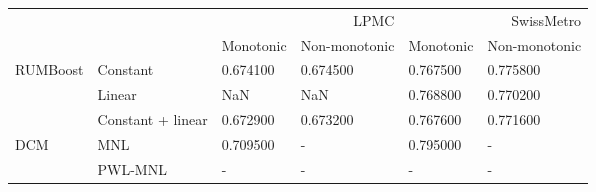 \begin{tabular}{llllll}
\toprule
 &  & \multicolumn{2}{r}{LPMC} & \multicolumn{2}{r}{SwissMetro} \\
 &  & Monotonic & Non-monotonic & Monotonic & Non-monotonic \\
\midrule
\multirow[t]{3}{*}{RUMBoost} & Constant & 0.674100 & 0.674500 & 0.767500 & 0.775800 \\
 & Linear & NaN & NaN & 0.768800 & 0.770200 \\
 & Constant + linear & 0.672900 & 0.673200 & 0.767600 & 0.771600 \\
\cline{1-6}
\multirow[t]{2}{*}{DCM} & MNL & 0.709500 & - & 0.795000 & - \\
 & PWL-MNL & - & - & - & - \\
\cline{1-6}
\bottomrule
\end{tabular}
